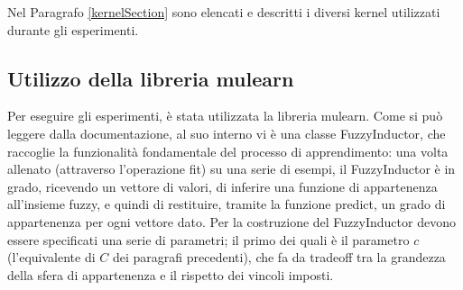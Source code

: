 \documentclass[12pt,a4paper]{report}
\begin{document}
Nel Paragrafo \ref{kernelSection} sono elencati e descritti i diversi kernel utilizzati durante gli esperimenti.

\subsection{Utilizzo della libreria mulearn}\label{FuzzifierSection}

Per eseguire gli esperimenti, è stata utilizzata la libreria mulearn\cite{mulearn}.
Come si può leggere dalla documentazione, al suo interno vi è una classe FuzzyInductor, che raccoglie la funzionalità fondamentale del processo di apprendimento: una volta allenato (attraverso l'operazione fit) su una serie di esempi, il FuzzyInductor è in grado, ricevendo un vettore di valori, di inferire una funzione di appartenenza all'insieme fuzzy, e quindi di restituire, tramite la funzione predict, un grado di appartenenza per ogni vettore dato.
Per la costruzione del FuzzyInductor devono essere specificati una serie di parametri; il primo dei quali è il parametro $c$ (l'equivalente di $C$ dei paragrafi precedenti), che fa da tradeoff tra la grandezza della sfera di appartenenza e il rispetto dei vincoli imposti. 
\end{document}
